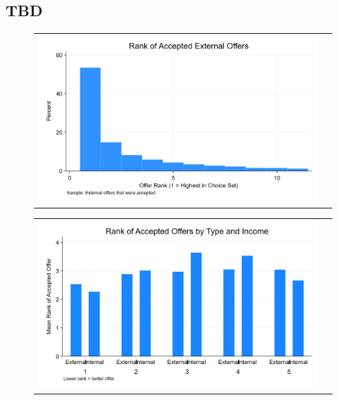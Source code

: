 \documentclass[12pt]{article}
\begin{document}


%
%


\newpage

\subsection{TBD}


  \begin{figure}[H]
\caption{}
 \label{fig:ie4_11}
\centering{}%
\begin{tabular}{cc}
\includegraphics[scale=0.27]{figures/IE4/IE4_rank_of_accepted_external.png} 
\end{tabular}
\end{figure} 









  \begin{figure}[H]
\caption{}
 \label{fig:ie4_11}
\centering{}%
\begin{tabular}{cc}
\includegraphics[scale=0.17]{figures/IE4/IE4_rank_by_type_income.png} 
\end{tabular}
\end{figure} 
\end{document}
